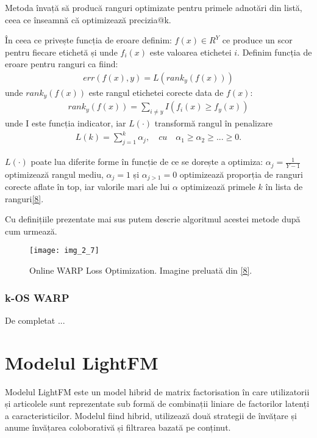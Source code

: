 Metoda învață să producă ranguri optimizate pentru primele adnotări din listă, ceea ce înseamnă că optimizează precizia@k.

În ceea ce privește funcția de eroare definim: $f(x) \in R^Y$ ce produce un scor pentru fiecare etichetă și unde $f_i(x)$ este valoarea etichetei $i$. Definim funcția de eroare pentru ranguri ca fiind:
\begin{align}
	err(f(x),y) = L(rank_y(f(x)))
\end{align}
unde $rank_y(f(x))$ este rangul etichetei corecte data de $f(x)$:
\begin{align}
	rank_y(f(x)) = \sum_{i \neq y}I(f_i(x) \geq f_y(x))
\end{align}
unde I este funcția indicator, iar $L(\cdot)$ transformă rangul în penalizare
\begin{align}
	L(k) = \sum_{j=1}^k\alpha_j, \quad cu \quad \alpha_1 \geq \alpha_2 \geq ... \geq 0.
\end{align}

$L(\cdot)$ poate lua diferite forme în funcție de ce se dorește a optimiza: $\alpha_j=\frac{1}{Y-1}$ optimizează rangul mediu, $\alpha_j=1$ și $\alpha_{j>1}=0$ optimizează proporția de ranguri corecte aflate în top, iar valorile mari ale lui $\alpha$ optimizează primele $k$ în lista de ranguri\hyperlink{JasonWestonSamyBengioNicolasUsunier}{[8]}.

Cu definițiile prezentate mai sus putem descrie algoritmul acestei metode după cum urmează.
\begin{figure}[!h]
	\centering
	\texttt{[image: img\_2\_7]}
	\caption[Online WARP Loss Optimization]{Online WARP Loss Optimization. Imagine preluată din \hyperlink{JasonWestonSamyBengioNicolasUsunier}{[8]}.}
\end{figure} 

\vspace{5mm}
\subsubsection*{k-OS WARP}
De completat ...

\section{Modelul LightFM}
Modelul LightFM este un model hibrid de matrix factorisation în care utilizatorii și articolele sunt reprezentate sub formă de combinații liniare de factorilor latenți a caracteristicilor. Modelul fiind hibrid, utilizează două strategii de învățare și anume învățarea coloborativă și filtrarea bazată pe conținut.


